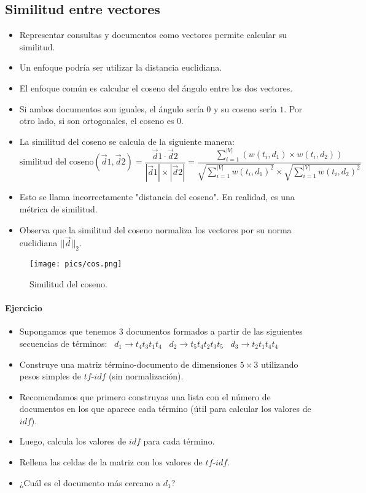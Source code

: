 \subsection{Similitud entre vectores}
\begin{itemize}
\item Representar consultas y documentos como vectores permite calcular su similitud.
\item Un enfoque podría ser utilizar la distancia euclidiana.
\item El enfoque común es calcular el coseno del ángulo entre los dos vectores.
\item Si ambos documentos son iguales, el ángulo sería $0$ y su coseno sería $1$. Por otro lado, si son ortogonales, el coseno es $0$.
\item La similitud del coseno se calcula de la siguiente manera:
\begin{displaymath}
\text{similitud del coseno}(\vec{d}{1},\vec{d}{2})= \frac{\vec{d}{1}\cdot \vec{d}{2}}{|\vec{d}{1}|\times|\vec{d}{2}|} = \frac{\sum_{i=1}^{|V|}(w(t_{i},d_{1})\times w(t_{i},d_{2}))}{\sqrt{\sum_{i=1}^{|V|} w(t_{i},d_{1})^2}\times \sqrt{\sum_{i=1}^{|V|} w(t_{i},d_{2})^2}}
\end{displaymath}
\item Esto se llama incorrectamente "distancia del coseno". En realidad, es una métrica de similitud.
\item Observa que la similitud del coseno normaliza los vectores por su norma euclidiana $||\vec{d}||_{2}$.

\end{itemize}

\begin{figure}[h!]
\centering
\texttt{[image: pics/cos.png]}
\caption{Similitud del coseno.}
\end{figure}
\paragraph{Ejercicio}
\begin{itemize}
\item Supongamos que tenemos $3$ documentos formados a partir de las siguientes secuencias de términos: \
$d_{1}\rightarrow t_{4}t_{3}t_{1}t_{4}$ \
$d_{2}\rightarrow t_{5}t_{4}t_{2}t_{3}t_{5}$ \
$d_{3}\rightarrow t_{2}t_{1}t_{4}t_{4}$ \
\item Construye una matriz término-documento de dimensiones $5\times3$ utilizando pesos simples de $tf$-$idf$ (sin normalización).
\item Recomendamos que primero construyas una lista con el número de documentos en los que aparece cada término (útil para calcular los valores de $idf$).
\item Luego, calcula los valores de $idf$ para cada término.
\item Rellena las celdas de la matriz con los valores de $tf$-$idf$.
\item ¿Cuál es el documento más cercano a $d_{1}$?
\end{itemize}

